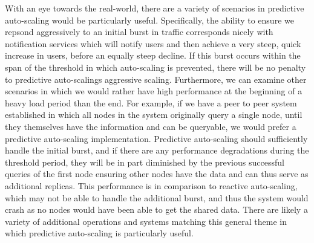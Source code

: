 With an eye towards the real-world, there are a variety of scenarios in
predictive auto-scaling would be particularly useful. Specifically, the ability
to ensure we repsond aggressively to an initial burst in traffic corresponds
nicely with notification services which will notify users and then achieve a
very steep, quick increase in users, before an equally steep decline. If this
burst occurs within the span of the threshold in which auto-scaling is
prevented, there will be no penalty to predictive auto-scalings aggressive
scaling. Furthermore, we can examine other scenarios in which we would rather
have high performance at the beginning of a heavy load period than the end. For
example, if we have a peer to peer system established in which all nodes in the
system originally query a single node, until they themselves have the
information and can be queryable, we would prefer a predictive auto-scaling
implementation. Predictive auto-scaling should sufficiently handle the initial
burst, and if there are any performance degradations during the threshold
period, they will be in part diminished by the previous successful queries of
the first node ensuring other nodes have the data and can thus serve as
additional replicas. This performance is in comparison to reactive auto-scaling,
which may not be able to handle the additional burst, and thus the system would
crash as no nodes would have been able to get the shared data. There are likely
a variety of additional operations and systems matching this general theme in
which predictive auto-scaling is particularly useful.
